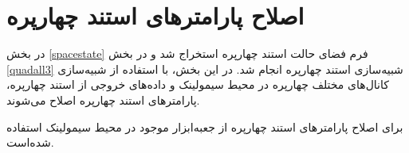 \section{اصلاح پارامتر‌های  استند چهارپره}\label{parameeter_estimation_section}
در بخش
\ref{spacestate}
فرم فضای حالت استند چهارپره استخراج شد و  در بخش
\ref{quadall3}
شبیه‌سازی استند چهارپره انجام شد.
در این بخش، با استفاده از شبیه‌سازی کانال‌های مختلف چهارپره در محیط سیمولینک و داده‌های خروجی  از استند چهارپره، پارامترهای استند چهارپره اصلاح می‌شوند.

برای اصلاح پارامترهای استند چهارپره از جعبه‌ابزار
موجود در محیط سیمولینک
استفاده شده‌است.
%
%
%
%
%
%
%
%

